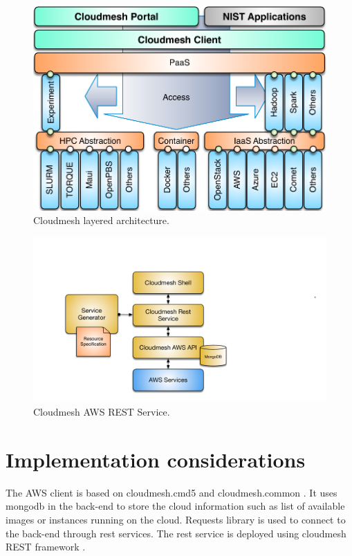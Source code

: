\documentclass[9pt,twocolumn,twoside]{../../styles/osajnl}
\begin{document}
\begin{figure}[htb]
  \centering
     \includegraphics[width=1.0\columnwidth]{images/cloudmesh-arch-1.pdf}
  \caption{Cloudmesh layered architecture.} 
  \label{F:NIST-arch}
\end{figure}

\begin{figure}[htb]
  \centering
     \includegraphics[width=1.0\columnwidth]{images/aws-rest.pdf}
  \caption{Cloudmesh AWS REST Service.} 
  \label{F:NIST-arch}
\end{figure}



\section{Implementation considerations}

The AWS client is based on cloudmesh.cmd5 \cite{www-cloudmesh-cmd5}
and cloudmesh.common \cite{www-cloudmesh-common}. It uses mongodb in
the back-end to store the cloud information such as list of available
images or instances running on the cloud. Requests library
\cite{www-python-requests} is used to connect to the back-end through
rest services. The rest service is deployed using cloudmesh REST
framework \cite{www-cloudmesh-rest}.
\end{document}

